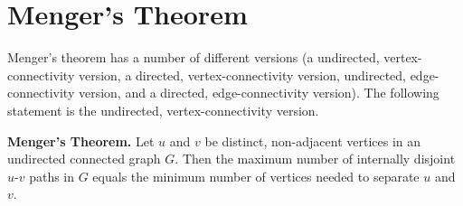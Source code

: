 
\section{Menger's Theorem}

Menger's theorem has a number of different versions
(a undirected, vertex-connectivity version,
a directed, vertex-connectivity version,
undirected, edge-connectivity version, and
a directed, edge-connectivity version). The following statement
is the undirected, vertex-connectivity version.

\begin{theorem}
\textbf{Menger's Theorem.}
Let $u$ and $v$ be distinct, non-adjacent vertices in an undirected
connected graph
$G$. Then the maximum number of internally disjoint $u$-$v$ paths in
$G$ equals the minimum number of vertices needed to separate $u$ and $v$.
\end{theorem}

